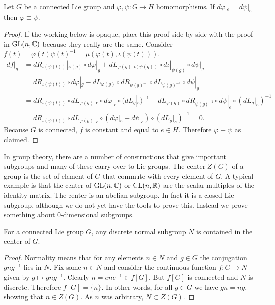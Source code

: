\begin{theorem}
\textup{\cite[Thm~3.16]{Warner1983}} \\
Let $G$ be a connected Lie group and $\varphi,\psi : G \to H$ homomorphisms.
If $d\varphi|_e = d\psi|_e$ then $\varphi \equiv \psi$.
\end{theorem}
\begin{proof}
If the working below is opaque, place this proof side-by-side with the proof in $\mathrm{GL}(n,\mathbb{C})$ because they really are the same.
Consider $f(t) = \varphi(t)\psi(t)^{-1} = \mu(\varphi(t), \iota(\psi(t)))$.
\begin{align*}
df|_g
&= dR_{\iota(\psi(t))}|_{\varphi(g)} \circ d\varphi|_g + dL_{\varphi(g)}|_{\iota(\psi(g))} \circ d\iota|_{\psi(g)} \circ d\psi|_g \\
&= dR_{\iota(\psi(t))} \circ d\varphi|_g - dL_{\varphi(g)} \circ dR_{{\psi(g)}^{-1}} \circ dL_{{\psi(g)}^{-1}} \circ d\psi|_g \\
&= dR_{\iota(\psi(t))} \circ dL_{\varphi(g)}|_e \circ d\varphi|_e \circ (dL_g|_e)^{-1} - dL_{\varphi(g)} \circ dR_{{\psi(g)}^{-1}} \circ d\psi|_e \circ (dL_g|_e)^{-1} \\
&= dR_{\iota(\psi(t))} \circ dL_{\varphi(g)}|_e \circ (d\varphi|_e - d\psi|_e) \circ (dL_g|_e)^{-1}
= 0.
\end{align*}
Because $G$ is connected, $f$ is constant and equal to $e \in H$.
Therefore $\varphi \equiv \psi$ as claimed.
\end{proof}

In group theory, there are a number of constructions that give important subgroups and many of these carry over to Lie groups.
The center $Z(G)$ of a group is the set of element of $G$ that commute with every element of $G$.
A typical example is that the center of $\mathrm{GL}(n,\mathbb{C})$ or $\mathrm{GL}(n,\mathbb{R})$ are the scalar multiples of the identity matrix.
The center is an abelian subgroup.
In fact it is a closed Lie subgroup, although we do not yet have the tools to prove this.
Instead we prove something about $0$-dimensional subgroups.

\begin{theorem}
\label{thm:discrete in center}
For a connected Lie group $G$, any discrete normal subgroup $N$ is contained in the center of $G$.
\end{theorem}
\begin{proof}
Normality means that for any elements $n \in N$ and $g \in G$ the conjugation $gng^{-1}$ lies in $N$.
Fix some $n\in N$ and consider the continuous function $f: G \to N$ given by $g \mapsto gng^{-1}$.
Clearly $n = ene^{-1} \in f[G]$.
But $f[G]$ is connected and $N$ is discrete.
Therefore $f[G] = \{n\}$.
In other words, for all $g \in G$ we have $gn = ng$, showing that $n \in Z(G)$.
As $n$ was arbitrary, $N \subset Z(G)$.
\end{proof}


